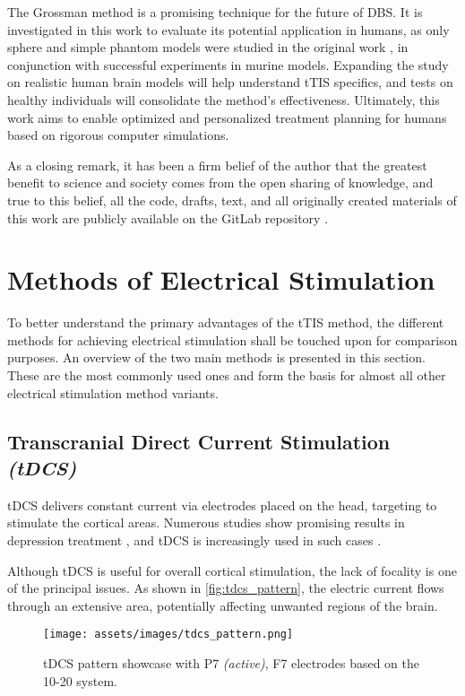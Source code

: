 The Grossman method is a promising technique for the future of \gls{DBS}. It is investigated in this work to evaluate its potential application in humans, as only sphere and simple phantom models were studied in the original work \cite{Grossman2017}, in conjunction with successful experiments in murine models. Expanding the study on realistic human brain models will help understand \gls{tTIS} specifics, and tests on healthy individuals will consolidate the method's effectiveness. Ultimately, this work aims to enable optimized and personalized treatment planning for humans based on rigorous computer simulations.

As a closing remark, it has been a firm belief of the author that the greatest benefit to science and society comes from the open sharing of knowledge, and true to this belief, all the code, drafts, text, and all originally created materials of this work are publicly available on the GitLab repository \cite{thesis_repo}.

\section{Methods of Electrical Stimulation}

To better understand the primary advantages of the \gls{tTIS} method, the different methods for achieving electrical stimulation shall be touched upon for comparison purposes. An overview of the two main methods is presented in this section. These are the most commonly used ones and form the basis for almost all other electrical stimulation method variants.

\subsection{Transcranial Direct Current Stimulation \textit{(tDCS)}}

\gls{tDCS} delivers constant current via electrodes placed on the head, targeting to stimulate the cortical areas. Numerous studies show promising results in depression treatment \cite{Moffa2020,Brunoni2016}, and \gls{tDCS} is increasingly used in such cases \cite{Nitsche2008}.

Although \gls{tDCS} is useful for overall cortical stimulation, the lack of focality is one of the principal issues. As shown in \autoref{fig:tdcs_pattern}, the electric current flows through an extensive area, potentially affecting unwanted regions of the brain.

\begin{figure}[H]
    \centering
    \texttt{[image: assets/images/tdcs\_pattern.png]}
    \caption{\gls{tDCS} pattern showcase with P7 \textit{(active)}, F7 electrodes based on the 10-20 system.}
    \label{fig:tdcs_pattern}
\end{figure}


